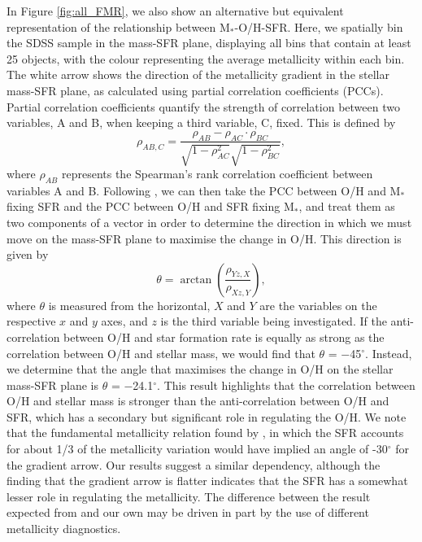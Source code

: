 \documentclass[usenatbib]{mnras} %
\begin{document}
In Figure \ref{fig:all_FMR}, we also show an alternative but equivalent representation of the relationship between M$_*$-O/H-SFR. Here, we spatially bin the SDSS sample in the mass-SFR plane, displaying all bins that contain at least 25 objects, with the colour representing the average metallicity within each bin. The white arrow shows the direction of the metallicity gradient in the stellar mass-SFR plane, as calculated using partial correlation coefficients (PCCs). Partial correlation coefficients quantify the strength of correlation between two variables, A and B, when keeping a third variable, C, fixed. This is defined by
\begin{equation}\label{PCC_er}
\rho_{AB,C} = \frac{\rho_{AB} - \rho_{AC}\cdot\rho_{BC}}{\sqrt{1-\rho^{2}_{AC}}\sqrt{1-\rho^{2}_{BC}}},
\end{equation}
where $\rho_{AB}$ represents the Spearman's rank correlation coefficient between variables A and B. Following \cite{Bluck_2020}, we can then take the PCC between O/H and M$_*$ fixing SFR and the PCC between O/H and SFR fixing M$_*$, and treat them as two components of a vector in order to determine the direction in which we must move on the mass-SFR plane to maximise the change in O/H. This direction is given by
\begin{equation}\label{PCC_vector_eq}
\theta = \arctan\left(\frac{\rho_{Yz, X}}{\rho_{Xz, Y}}\right),
\end{equation}
where $\theta$ is measured from the horizontal, $X$ and $Y$ are the variables on the respective $x$ and $y$ axes, and $z$ is the third variable being investigated. If the anti-correlation between O/H and star formation rate is equally as strong as the correlation between O/H and stellar mass, we would find that $\theta$ = $-$45$^{\circ}$. Instead, we determine that the angle that maximises the change in O/H on the stellar mass-SFR plane is $\theta$ = $-$24.1$^{\circ}$. This result highlights that the correlation between O/H and stellar mass is stronger than the anti-correlation between O/H and SFR, which has a secondary but significant role in regulating the O/H. We note that the fundamental metallicity relation found by \cite{Mannucci_2010}, in which the SFR accounts for about 1/3 of the metallicity variation would have implied an angle of -30$^{\circ}$ for the gradient arrow. Our results suggest a similar dependency, although the finding that the gradient arrow is flatter indicates that the SFR has a somewhat lesser role in regulating the metallicity. The difference between the result expected from \cite{Mannucci_2010} and our own may be driven in part by the use of different metallicity diagnostics.
\end{document}
